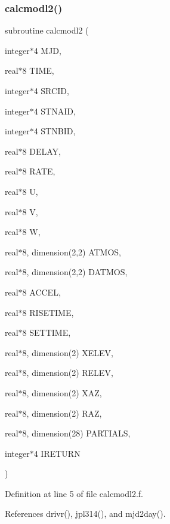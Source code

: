 \subsubsection{\texorpdfstring{calcmodl2()}{calcmodl2()}}
{\footnotesize\ttfamily subroutine calcmodl2 (\begin{DoxyParamCaption}\item[{integer$\ast$4}]{M\+JD,  }\item[{real$\ast$8}]{T\+I\+ME,  }\item[{integer$\ast$4}]{S\+R\+C\+ID,  }\item[{integer$\ast$4}]{S\+T\+N\+A\+ID,  }\item[{integer$\ast$4}]{S\+T\+N\+B\+ID,  }\item[{real$\ast$8}]{D\+E\+L\+AY,  }\item[{real$\ast$8}]{R\+A\+TE,  }\item[{real$\ast$8}]{U,  }\item[{real$\ast$8}]{V,  }\item[{real$\ast$8}]{W,  }\item[{real$\ast$8, dimension(2,2)}]{A\+T\+M\+OS,  }\item[{real$\ast$8, dimension(2,2)}]{D\+A\+T\+M\+OS,  }\item[{real$\ast$8}]{A\+C\+C\+EL,  }\item[{real$\ast$8}]{R\+I\+S\+E\+T\+I\+ME,  }\item[{real$\ast$8}]{S\+E\+T\+T\+I\+ME,  }\item[{real$\ast$8, dimension(2)}]{X\+E\+L\+EV,  }\item[{real$\ast$8, dimension(2)}]{R\+E\+L\+EV,  }\item[{real$\ast$8, dimension(2)}]{X\+AZ,  }\item[{real$\ast$8, dimension(2)}]{R\+AZ,  }\item[{real$\ast$8, dimension(28)}]{P\+A\+R\+T\+I\+A\+LS,  }\item[{integer$\ast$4}]{I\+R\+E\+T\+U\+RN }\end{DoxyParamCaption})}



Definition at line 5 of file calcmodl2.\+f.



References drivr(), jpl314(), and mjd2day().

\mbox{\label{calcmodl2_8f_a4946db8f413e013754dfec88b5cb45c4}} 

